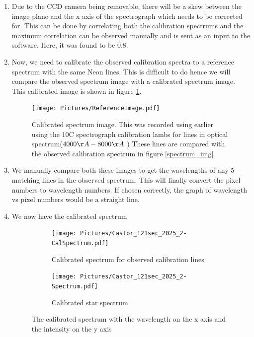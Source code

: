 \documentclass[12pt,a4paper]{article}
\begin{document}
\begin{enumerate}
        \item Due to the CCD camera being removable, there will be a skew between the image plane and the x axis of the spectrograph which needs to be corrected for. This can be done by correlating both the calibration spectrums
              and the maximum correlation can be observed manually and is sent as an input to the software. Here, it was found to be $0.8$.
        \item Now, we need to calibrate the observed calibration spectra to a reference spectrum with the same Neon lines. This is difficult to do hence we will compare
              the observed spectrum image with a calibrated spectrum image. This calibrated image is shown in figure \ref{fig:calibrated_cal_image}.
              \begin{figure}[H]
                \centering
                \texttt{[image: Pictures/ReferenceImage.pdf]}
                \caption{Calibrated spectrum image. This was recorded using earlier using the 10C spectrograph calibration lambs for lines in optical spectrum($4000\AA-8000\AA$ ) These lines are compared with the observed calibration spectrum in figure \ref{spectrum_img}}
                \label{fig:calibrated_cal_image}
              \end{figure} 
        \item We manually compare both these images to get the wavelengths of any 5 matching lines in the observed spectrum. This will finally convert the pixel numbers to wavelength numbers. If chosen correctly, the graph of wavelength vs pixel numbers would be a straight line.
        \item We now have the calibrated spectrum
              \begin{figure}[H]
                \centering
                \begin{subfigure}{0.49\textwidth}
                  \centering
                  \texttt{[image: Pictures/Castor\_121sec\_2025\_2-CalSpectrum.pdf]}
                  \caption{Calibrated spectrum for observed calibration lines}
                  \label{fig:calibrated_calspec}
                  
                \end{subfigure}
                \begin{subfigure}{0.49\textwidth}
                  \centering
                  \texttt{[image: Pictures/Castor\_121sec\_2025\_2-Spectrum.pdf]}
                  \caption{Calibrated star spectrum}
                  \label{fig:calibrated_starspec}
                \end{subfigure}
                \caption{The calibrated spectrum with the wavelength on the x axis and the intensity on the y axis}
              \end{figure}
      \end{enumerate}
\end{document}
